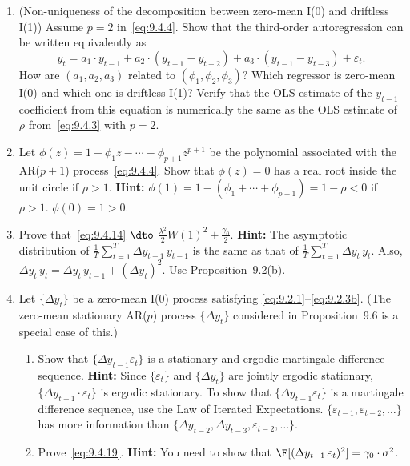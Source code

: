 \begin{enumerate}
\item (Non-uniqueness of the decomposition between zero-mean I(0) and driftless
I(1)) \enspace Assume $p = 2$ in~\eqref{eq:9.4.4}. Show that the third-order autoregression can
be written equivalently as
\[
y_t = a_1 \cdot y_{t-1} + a_2 \cdot (y_{t-1} - y_{t-2}) + a_3 \cdot (y_{t-1} - y_{t-3}) + \varepsilon_t.
\]
How are $(a_1, a_2, a_3)$ related to $(\phi_1, \phi_2, \phi_3)$? Which regressor is zero-mean I(0)
and which one is driftless I(1)? Verify that the OLS estimate of the $y_{t-1}$ coefficient from this equation is numerically the same as the OLS estimate of $\rho$ from~\eqref{eq:9.4.3} with $p = 2$.

\item Let $\phi(z) = 1 - \phi_1 z - \cdots - \phi_{p+1} z^{p+1}$ be the polynomial associated with the
AR($p+1$) process~\eqref{eq:9.4.4}. Show that $\phi(z) = 0$ has a real root inside the unit
circle if $\rho > 1$. \textbf{Hint:} $\phi(1) = 1 - (\phi_1 + \cdots + \phi_{p+1}) = 1 - \rho < 0$ if $\rho > 1$.
$\phi(0) = 1 > 0$.

\item Prove that~\eqref{eq:9.4.14} $\dto$ $\frac{\lambda^2}{2} W(1)^2 + \frac{\gamma_0}{2}$. \textbf{Hint:} The asymptotic distribution
of $\frac{1}{T}\sum_{t=1}^{T}\Delta y_{t-1}\, y_{t-1}$ is the same as that of $\frac{1}{T}\sum_{t=1}^{T}\Delta y_t\, y_t$. Also, $\Delta y_t\, y_t =
\Delta y_t\, y_{t-1} + (\Delta y_t)^2$. Use Proposition~9.2(b).

\item Let $\{\Delta y_t\}$ be a zero-mean I(0) process satisfying \eqref{eq:9.2.1}--\eqref{eq:9.2.3b}. (The zero-mean stationary AR($p$) process $\{\Delta y_t\}$ considered in Proposition~9.6 is a
special case of this.)

\begin{enumerate}[label=(\alph*)]
\item Show that $\{\Delta y_{t-1}\varepsilon_t\}$ is a stationary and ergodic martingale difference
sequence. \textbf{Hint:} Since $\{\varepsilon_t\}$ and $\{\Delta y_t\}$ are jointly ergodic stationary, $\{\Delta y_{t-1} \cdot
\varepsilon_t\}$ is ergodic stationary. To show that $\{\Delta y_{t-1}\varepsilon_t\}$ is a martingale difference
sequence, use the Law of Iterated Expectations. $\{\varepsilon_{t-1}, \varepsilon_{t-2}, \ldots\}$ has more
information than $\{\Delta y_{t-2}, \Delta y_{t-3}, \varepsilon_{t-2}, \ldots\}$.

\item Prove~\eqref{eq:9.4.19}. \textbf{Hint:} You need to show that $\E[(\Delta y_{t-1}\,\varepsilon_t)^2] = \gamma_0 \cdot \sigma^2$.
\end{enumerate}


\end{enumerate}
